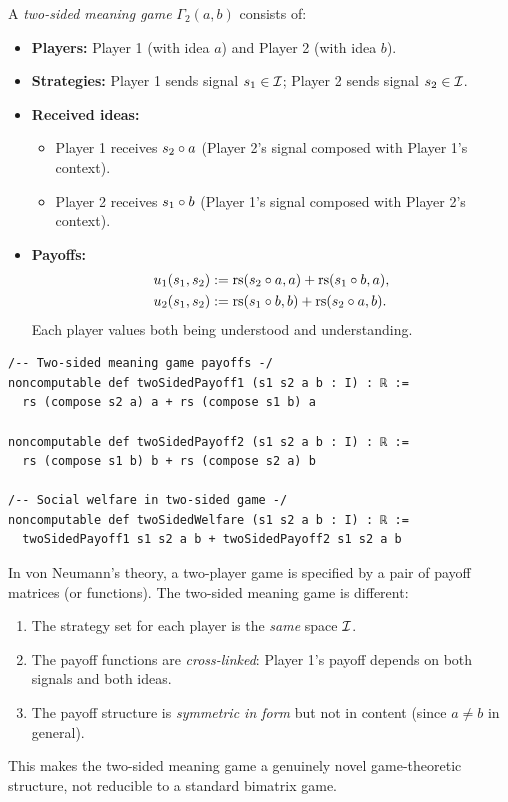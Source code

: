 \begin{definition}
\label{def:two-sided}
A \emph{two-sided meaning game} $\Gamma_2(a, b)$ consists of:
\begin{itemize}
\item \textbf{Players:} Player 1 (with idea $a$) and Player 2 (with idea $b$).
\item \textbf{Strategies:} Player 1 sends signal $s_1 \in \mathcal{I}$; Player 2
sends signal $s_2 \in \mathcal{I}$.
\item \textbf{Received ideas:}
\begin{itemize}
\item Player 1 receives $s_2 \circ a$ (Player 2's signal composed with
Player 1's context).
\item Player 2 receives $s_1 \circ b$ (Player 1's signal composed with
Player 2's context).
\end{itemize}
\item \textbf{Payoffs:}
\begin{align}
u_1(s_1, s_2) &:= \mathrm{rs}(s_2 \circ a, a) + \mathrm{rs}(s_1 \circ b, a),
\label{eq:two-sided-1} \\
u_2(s_1, s_2) &:= \mathrm{rs}(s_1 \circ b, b) + \mathrm{rs}(s_2 \circ a, b).
\label{eq:two-sided-2}
\end{align}
Each player values both being understood and understanding.
\end{itemize}
\end{definition}

\begin{lstlisting}[caption={Lean 4: Two-sided meaning game}]
/-- Two-sided meaning game payoffs -/
noncomputable def twoSidedPayoff1 (s1 s2 a b : I) : ℝ :=
  rs (compose s2 a) a + rs (compose s1 b) a

noncomputable def twoSidedPayoff2 (s1 s2 a b : I) : ℝ :=
  rs (compose s1 b) b + rs (compose s2 a) b

/-- Social welfare in two-sided game -/
noncomputable def twoSidedWelfare (s1 s2 a b : I) : ℝ :=
  twoSidedPayoff1 s1 s2 a b + twoSidedPayoff2 s1 s2 a b
\end{lstlisting}

\begin{remark}
In von Neumann's theory, a two-player game is specified by a pair of payoff
matrices (or functions). The two-sided meaning game is different:
\begin{enumerate}
\item The strategy set for each player is the \emph{same} space $\mathcal{I}$.
\item The payoff functions are \emph{cross-linked}: Player 1's payoff depends
on both signals and both ideas.
\item The payoff structure is \emph{symmetric in form} but not in content
(since $a \neq b$ in general).
\end{enumerate}
This makes the two-sided meaning game a genuinely novel game-theoretic
structure, not reducible to a standard bimatrix game.
\end{remark}


